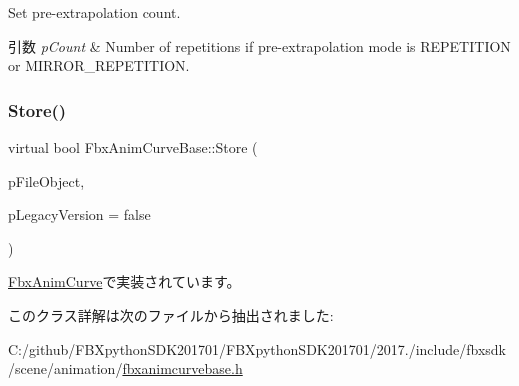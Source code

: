 Set pre-\/extrapolation count. 
\begin{DoxyParams}{引数}
{\em p\+Count} & Number of repetitions if pre-\/extrapolation mode is R\+E\+P\+E\+T\+I\+T\+I\+ON or M\+I\+R\+R\+O\+R\+\_\+\+R\+E\+P\+E\+T\+I\+T\+I\+ON. \\
\hline
\end{DoxyParams}
\mbox{\label{class_fbx_anim_curve_base_a82eba55521f1c0e792b71cb432dac170}} 
\subsubsection{\texorpdfstring{Store()}{Store()}}
{\footnotesize\ttfamily virtual bool Fbx\+Anim\+Curve\+Base\+::\+Store (\begin{DoxyParamCaption}\item[{\hyperlink{class_fbx_i_o}{Fbx\+IO} $\ast$}]{p\+File\+Object,  }\item[{bool}]{p\+Legacy\+Version = {\ttfamily false} }\end{DoxyParamCaption})\hspace{0.3cm}{\ttfamily [pure virtual]}}



\hyperlink{class_fbx_anim_curve_a0ef3229e43aaca33ab50161235541060}{Fbx\+Anim\+Curve}で実装されています。



このクラス詳解は次のファイルから抽出されました\+:\begin{DoxyCompactItemize}
\item 
C\+:/github/\+F\+B\+Xpython\+S\+D\+K201701/\+F\+B\+Xpython\+S\+D\+K201701/2017./include/fbxsdk/scene/animation/\hyperlink{fbxanimcurvebase_8h}{fbxanimcurvebase.\+h}\end{DoxyCompactItemize}
